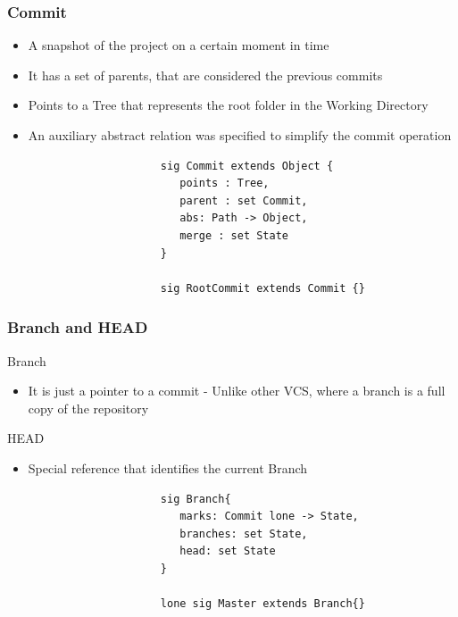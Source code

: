 \documentclass{beamer}
\begin{document}
\begin{frame}[fragile]
   \frametitle{Commit}
   \begin{itemize}
      \item A snapshot of the project on a certain moment
      in time
      \item It has a set of parents, that are considered the previous commits 
	   \item Points to a Tree that represents the root folder in the
	Working Directory
      \item An auxiliary abstract relation was specified
   to simplify the commit operation
   \end{itemize}
   \tiny
   \color{blue}
   \begin{lstlisting}
                        sig Commit extends Object {
                           points : Tree,
                           parent : set Commit,
                           abs: Path -> Object,
                           merge : set State
                        }
                           
                        sig RootCommit extends Commit {}
\end{lstlisting}
\end{frame}

\begin{frame}[fragile]
\frametitle{Branch and HEAD}
   \begin{block}{Branch}
      \begin{itemize}
         \item It is just a pointer to a commit - Unlike other VCS, where a branch is a full copy of the repository
      \end{itemize}
   \end{block}
   \begin{block}{HEAD}
      \begin{itemize} 
         \item Special reference that identifies the current Branch
      \end{itemize}
   \end{block}
   \tiny
   \color{blue}
   \begin{lstlisting}
                        sig Branch{
                           marks: Commit lone -> State,
                           branches: set State,
                           head: set State
                        }

                        lone sig Master extends Branch{}
   \end{lstlisting}
\end{frame}
\end{document}
